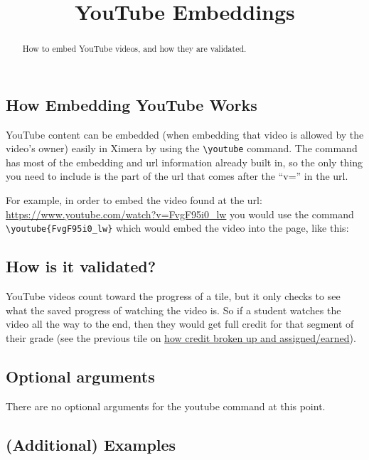 \documentclass{ximera}
\title{YouTube Embeddings}
\begin{document}
\begin{abstract}
    How to embed YouTube videos, and how they are validated.
\end{abstract}
\maketitle

    \subsection*{How Embedding YouTube Works}
        YouTube content can be embedded (when embedding that video is allowed by the video's owner) easily in Ximera by using the \verb|\youtube| command. The command has most of the embedding and url information already built in, so the only thing you need to include is the part of the url that comes after the ``v='' in the url.
        
        For example, in order to embed the video found at the url: \url{https://www.youtube.com/watch?v=FvgF95i0_lw} you would use the command \verb|\youtube{FvgF95i0_lw}| which would embed the video into the page, like this:
        
    
    
    \subsection*{How is it validated?}
        YouTube videos count toward the progress of a tile, but it only checks to see what the saved progress of watching the video is. So if a student watches the video all the way to the end, then they would get full credit for that segment of their grade (see the previous tile on \href{https://xronos.clas.ufl.edu/examples/exampleCore/assignments/creditAllocation}{how credit broken up and assigned/earned}). 
        
        
    \subsection*{Optional arguments}
        There are no optional arguments for the youtube command at this point. 
    

    \subsection*{(Additional) Examples}
    
\end{document}
